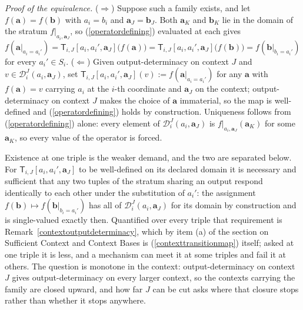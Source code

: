 \documentclass{article}
\theoremstyle{definition}
\theoremstyle{remark}
\begin{document}
\noindent \textit{Proof of the equivalence.} ($\Rightarrow$) Suppose such a family exists, and let $f(\boldsymbol{a}) = f(\boldsymbol{b})$ with $a_i = b_i$ and $\boldsymbol{a}_J = \boldsymbol{b}_J$. Both $\boldsymbol{a}_K$ and $\boldsymbol{b}_K$ lie in the domain of the stratum $f|_{a_i, \boldsymbol{a}_J}$, so (\ref{operatordefining}) evaluated at each gives $f(\boldsymbol{a}|_{a_i = a_i'}) = \mathsf{T}_{i,J}[a_i, a_i', \boldsymbol{a}_J]\bigl(f(\boldsymbol{a})\bigr) = \mathsf{T}_{i,J}[a_i, a_i', \boldsymbol{a}_J]\bigl(f(\boldsymbol{b})\bigr) = f(\boldsymbol{b}|_{b_i = a_i'})$ for every $a_i' \in S_i$. ($\Leftarrow$) Given output-determinacy on context $J$ and $v \in \mathcal{D}_i^J(a_i, \boldsymbol{a}_J)$, set $\mathsf{T}_{i,J}[a_i, a_i', \boldsymbol{a}_J](v) := f(\boldsymbol{a}|_{a_i = a_i'})$ for any $\boldsymbol{a}$ with $f(\boldsymbol{a}) = v$ carrying $a_i$ at the $i$-th coordinate and $\boldsymbol{a}_J$ on the context; output-determinacy on context $J$ makes the choice of $\boldsymbol{a}$ immaterial, so the map is well-defined and (\ref{operatordefining}) holds by construction. Uniqueness follows from (\ref{operatordefining}) alone: every element of $\mathcal{D}_i^J(a_i, \boldsymbol{a}_J)$ is $f|_{a_i, \boldsymbol{a}_J}(\boldsymbol{a}_K)$ for some $\boldsymbol{a}_K$, so every value of the operator is forced.

\noindent Existence at one triple is the weaker demand, and the two are separated below. For $\mathsf{T}_{i,J}[a_i, a_i', \boldsymbol{a}_J]$ to be well-defined on its declared domain it is necessary and sufficient that any two tuples of the stratum sharing an output respond identically to each other under the substitution of $a_i'$: the assignment $f(\boldsymbol{b}) \mapsto f(\boldsymbol{b}|_{b_i = a_i'})$ has all of $\mathcal{D}_i^J(a_i, \boldsymbol{a}_J)$ for its domain by construction and is single-valued exactly then. Quantified over every triple that requirement is Remark~\ref{contextoutputdeterminacy}, which by item (a) of the section on Sufficient Context and Context Bases is (\ref{contexttransitionmap}) itself; asked at one triple it is less, and a mechanism can meet it at some triples and fail it at others. The question is monotone in the context: output-determinacy on context $J$ gives output-determinacy on every larger context, so the contexts carrying the family are closed upward, and how far $J$ can be cut asks where that closure stops rather than whether it stops anywhere.
\end{document}
